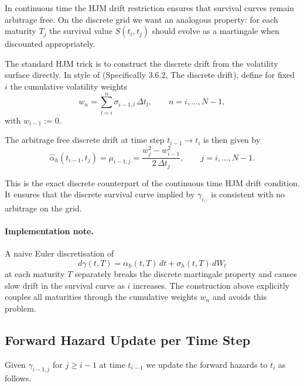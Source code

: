 In continuous time the HJM drift restriction ensures that survival curves
remain arbitrage free. On the discrete grid we want an analogous property:
for each maturity $T_j$ the survival value $S(t_i, t_j)$ should evolve as a
martingale when discounted appropriately.

The standard HJM trick is to construct the discrete drift from the volatility
surface directly. In style of \cite{glasserman2004} (Specifically 3.6.2, The discrete drift), define for fixed $i$ the cumulative
volatility weights
\[
w_n
  = \sum_{l=i}^n \sigma_{i-1,l}\,\Delta t_l,
  \qquad n = i,\dots,N-1,
\]
with $w_{i-1} := 0$.

The arbitrage free discrete drift at time step $t_{i-1} \to t_i$ is then given by
\[
\widehat{\alpha}_h(t_{i-1}, t_j)
  = \mu_{i-1,j}
  = \frac{w_j^2 - w_{i-1}^2}{2\,\Delta t_j},
  \qquad j = i,\dots,N-1.
\]

This is the exact discrete counterpart of the continuous time HJM drift
condition. It ensures that the discrete survival curve implied by
$\gamma_{i,\cdot}$ is consistent with no arbitrage on the grid.

\paragraph{Implementation note.}
A naive Euler discretisation of
\[
d\gamma(t,T) = \alpha_h(t,T)\,dt + \sigma_h(t,T)\,dW_t
\]
at each maturity $T$ separately breaks the discrete martingale property and
causes slow drift in the survival curve as $i$ increases. The construction
above explicitly couples all maturities through the cumulative weights $w_n$
and avoids this problem.

\subsection{Forward Hazard Update per Time Step}

Given $\gamma_{i-1,j}$ for $j \ge i-1$ at time $t_{i-1}$ we update the forward
hazards to $t_i$ as follows.

